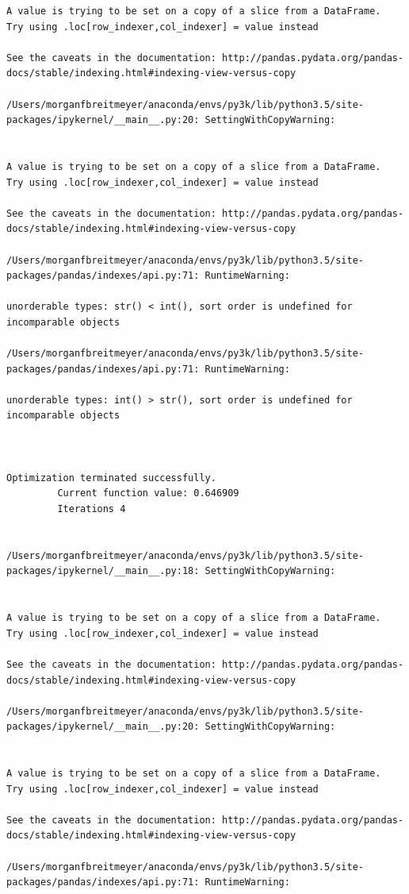 \begin{lstlisting}
A value is trying to be set on a copy of a slice from a DataFrame.
Try using .loc[row_indexer,col_indexer] = value instead

See the caveats in the documentation: http://pandas.pydata.org/pandas-docs/stable/indexing.html#indexing-view-versus-copy

/Users/morganfbreitmeyer/anaconda/envs/py3k/lib/python3.5/site-packages/ipykernel/__main__.py:20: SettingWithCopyWarning:


A value is trying to be set on a copy of a slice from a DataFrame.
Try using .loc[row_indexer,col_indexer] = value instead

See the caveats in the documentation: http://pandas.pydata.org/pandas-docs/stable/indexing.html#indexing-view-versus-copy

/Users/morganfbreitmeyer/anaconda/envs/py3k/lib/python3.5/site-packages/pandas/indexes/api.py:71: RuntimeWarning:

unorderable types: str() < int(), sort order is undefined for incomparable objects

/Users/morganfbreitmeyer/anaconda/envs/py3k/lib/python3.5/site-packages/pandas/indexes/api.py:71: RuntimeWarning:

unorderable types: int() > str(), sort order is undefined for incomparable objects



Optimization terminated successfully.
         Current function value: 0.646909
         Iterations 4


/Users/morganfbreitmeyer/anaconda/envs/py3k/lib/python3.5/site-packages/ipykernel/__main__.py:18: SettingWithCopyWarning:


A value is trying to be set on a copy of a slice from a DataFrame.
Try using .loc[row_indexer,col_indexer] = value instead

See the caveats in the documentation: http://pandas.pydata.org/pandas-docs/stable/indexing.html#indexing-view-versus-copy

/Users/morganfbreitmeyer/anaconda/envs/py3k/lib/python3.5/site-packages/ipykernel/__main__.py:20: SettingWithCopyWarning:


A value is trying to be set on a copy of a slice from a DataFrame.
Try using .loc[row_indexer,col_indexer] = value instead

See the caveats in the documentation: http://pandas.pydata.org/pandas-docs/stable/indexing.html#indexing-view-versus-copy

/Users/morganfbreitmeyer/anaconda/envs/py3k/lib/python3.5/site-packages/pandas/indexes/api.py:71: RuntimeWarning:


\end{lstlisting}

